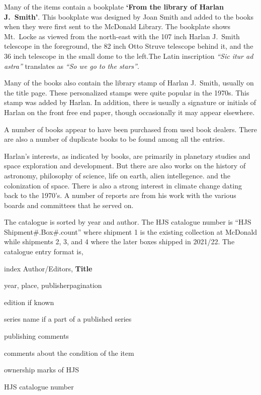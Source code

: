 Many of the items contain a bookplate \textbf{`From the library of
  Harlan J.~Smith'}.  This bookplate was designed by Joan Smith and
added to the books when they were first sent to the McDonald
Library. The bookplate shows Mt.~Locke as viewed from the north-east
with the 107 inch Harlan J.~Smith telescope in the foreground, the 82
inch Otto Struve telescope behind it, and the 36 inch telescope in the
small dome to the left.The Latin inscription \textit{``Sic itur ad
  astra''} translates as \textit{``So we go to the stars''}.

Many of the books also contain the library stamp of Harlan J.~Smith,
usually on the title page. These personalized stamps were quite
popular in the 1970s. This stamp was added by Harlan. In addition,
there is usually a signature or initials of Harlan on the front free
end paper, though occasionally it may appear elsewhere.

A number of books appear to have been purchased from used book dealers.
There are also a number of duplicate books to be found among all the
entries.

Harlan's interests, as indicated by books, are primarily in planetary
studies and space exploration and development. But there are also
works on the history of astronomy, philosophy of science, life on
earth, alien intellegence. and the colonization of space. There is
also a strong interest in climate change dating back to the 1970's.
A number of reports are from his work with the various boards and
committees that he served on.

The catalogue is sorted by year and author. The HJS catalogue number
is ``HJS Shipment\#.Box\#.count'' where shipment 1 is the existing
collection at McDonald while shipments 2, 3, and 4 where the later
boxes shipped in 2021/22. The catalogue entry format is,
\newline

\footnotesize{index} Author/Editors, \textbf{Title}

year, place, publisher\hspace{1em}pagination

edition if known

series name if a part of a published series

publishing comments

comments about the condition of the item

ownership marks of HJS

HJS catalogue number



